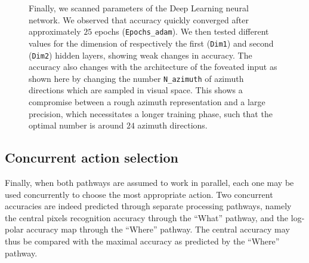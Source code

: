 \begin{figure}[t!]
{		\B Finally, we scanned parameters of the Deep Learning neural network. We observed that accuracy quickly converged after approximately $25$ epochs (\texttt{Epochs\_adam}). We then tested different values for the dimension of respectively the first (\texttt{Dim1}) and second (\texttt{Dim2}) hidden layers, showing weak changes in accuracy. %
		\C
		The accuracy also changes with the architecture of the foveated input as shown here by changing the number \texttt{N\_azimuth} of azimuth directions which are sampled in visual space. This shows a compromise between a rough azimuth representation and a large precision, which necessitates a longer training phase, such that the optimal number is around $24$ azimuth directions. %
		\label{fig:params}}%
\end{figure}%



\subsection{Concurrent action selection}
\label{sec:IG}

Finally, when both pathways are assumed to work in parallel, each one may be used concurrently to choose the most appropriate action. Two concurrent accuracies are indeed  predicted through separate processing pathways, namely the central pixels recognition accuracy through the ``What'' pathway, and the log-polar accuracy map through the ``Where'' pathway. The central accuracy may thus be compared with the maximal accuracy as predicted by the ``Where'' pathway.

